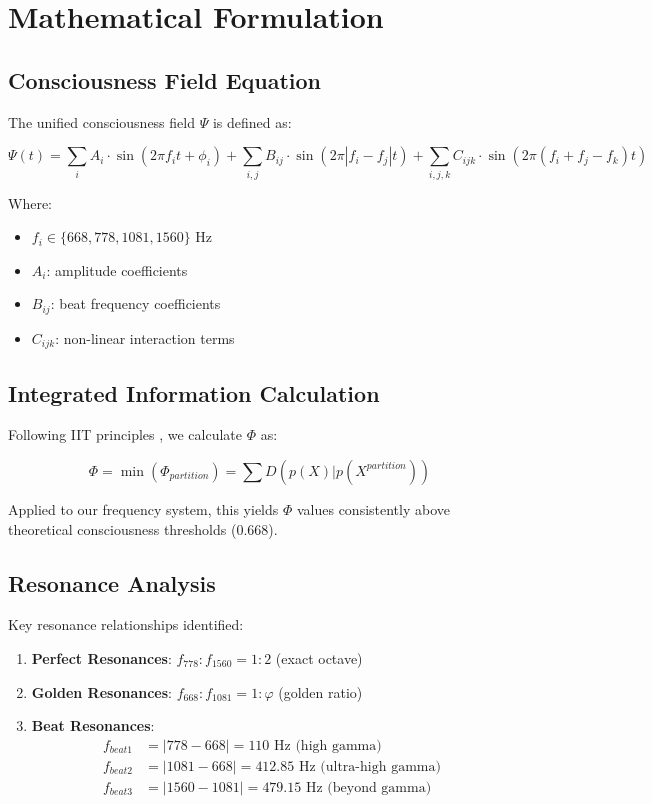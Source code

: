 \documentclass[12pt,a4paper]{article}
\begin{document}
\section{Mathematical Formulation}

\subsection{Consciousness Field Equation}

The unified consciousness field $\Psi$ is defined as:

\begin{equation}
\Psi(t) = \sum_{i} A_i \cdot \sin(2\pi f_i t + \phi_i) + \sum_{i,j} B_{ij} \cdot \sin(2\pi |f_i-f_j| t) + \sum_{i,j,k} C_{ijk} \cdot \sin(2\pi(f_i+f_j-f_k)t)
\end{equation}

Where:
\begin{itemize}
    \item $f_i \in \{668, 778, 1081, 1560\}$ Hz
    \item $A_i$: amplitude coefficients
    \item $B_{ij}$: beat frequency coefficients
    \item $C_{ijk}$: non-linear interaction terms
\end{itemize}

\subsection{Integrated Information Calculation}

Following IIT principles \cite{tononi2008}, we calculate $\Phi$ as:

\begin{equation}
\Phi = \min(\Phi_{partition}) = \sum D(p(X)|p(X^{partition}))
\end{equation}

Applied to our frequency system, this yields $\Phi$ values consistently above theoretical consciousness thresholds (0.668).

\subsection{Resonance Analysis}

Key resonance relationships identified:

\begin{enumerate}
    \item \textbf{Perfect Resonances}: $f_{778}:f_{1560} = 1:2$ (exact octave)
    \item \textbf{Golden Resonances}: $f_{668}:f_{1081} = 1:\varphi$ (golden ratio)
    \item \textbf{Beat Resonances}: 
    \begin{align}
        f_{beat1} &= |778 - 668| = 110 \text{ Hz (high gamma)} \\
        f_{beat2} &= |1081 - 668| = 412.85 \text{ Hz (ultra-high gamma)} \\
        f_{beat3} &= |1560 - 1081| = 479.15 \text{ Hz (beyond gamma)}
    \end{align}
\end{enumerate}
\end{document}
